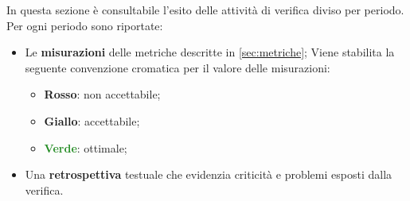 In questa sezione è consultabile l'esito delle attività di verifica diviso per periodo.\newline
Per ogni periodo sono riportate:
\begin{itemize}
	\item Le \textbf{misurazioni} delle metriche descritte in \cref{sec:metriche}; Viene stabilita la seguente convenzione cromatica per il valore delle misurazioni:
		\begin{itemize}
			\item \textcolor{BrickRed}{\textbf{Rosso}}: non accettabile;
			\item \textcolor{YellowOrange}{\textbf{Giallo}}: accettabile;
			\item \textcolor{ForestGreen}{\textbf{Verde}}: ottimale;
		\end{itemize}
	\item Una \textbf{retrospettiva} testuale che evidenzia criticità e problemi esposti dalla verifica.
\end{itemize}